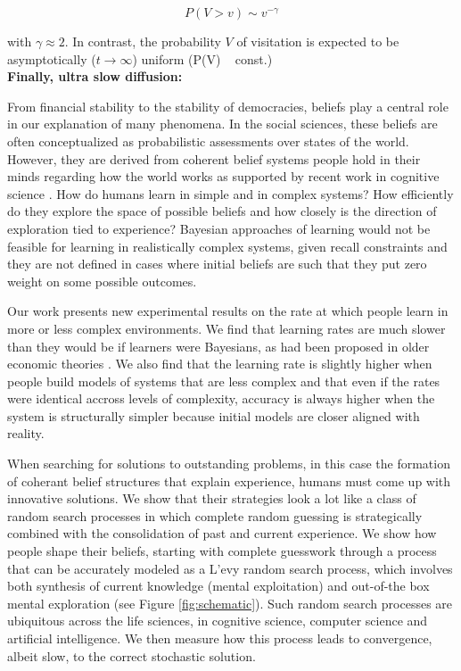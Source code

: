 \begin{equation}
P(V > v) \sim v^{-\gamma}
\end{equation}

with $\gamma \approx 2$. In contrast, the probability $V$ of visitation is expected to be asymptotically ($t \rightarrow \infty$) uniform (P(V) ~ const.)\\

{\bf Finally, ultra slow diffusion: }



\clearpage

From financial stability to the stability of democracies, beliefs play a central role in our explanation of many phenomena. In the social sciences, these beliefs are often conceptualized as probabilistic assessments over states of the world.  However, they are derived from coherent belief systems people hold in their minds regarding how the world works as supported by recent work in cognitive science \cite{lombrozo2006structure, anderson1990cognitive}.  How do humans learn in simple and in complex systems?  How efficiently do they explore the space of possible beliefs and how closely is the direction of exploration tied to experience?  Bayesian approaches of learning would not be feasible for learning in realistically complex systems, given recall constraints and they are not defined in cases where initial beliefs are such that they put zero weight on some possible outcomes.  

Our work presents new experimental results on the rate at which people learn in more or less complex environments. We find that learning rates are much slower than they would be if learners were Bayesians, as had been proposed in older economic theories \cite{Boyer84, Prescott72, Rothschild74, McLennan84, Mirman84, Easley89, Kiefer89}. We also find that the learning rate is slightly higher when people build models of systems that are less complex and that even if the rates were identical accross levels of complexity, accuracy is always higher when the system is structurally simpler because initial models are closer aligned with reality.  

When searching for solutions to outstanding problems, in this case the formation of coherant belief structures that explain experience, humans must come up with innovative solutions.  We show that their strategies look a lot like a class of random search processes in which complete random guessing is strategically combined with the consolidation of past and current experience. We show how people shape their beliefs, starting with complete guesswork through a process that can be accurately modeled as a L'evy random search process, which involves both synthesis of current knowledge (mental exploitation) and out-of-the box mental exploration (see Figure \ref{fig:schematic}). Such random search processes are ubiquitous across the life sciences, in cognitive science, computer science  and artificial intelligence. We then measure how this process leads to convergence, albeit slow, to the correct stochastic solution.

